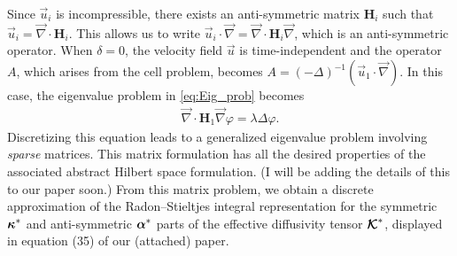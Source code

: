 \documentclass[11pt]{amsart}
\newcommand{\Hb}{\mathbf{H}}
\newcommand\Kbc{\mbox{\boldmath${\mathcal{K}}$}}
\newcommand\balpha{\mbox{\boldmath${\alpha}$}}
\newcommand\bkappa{\mbox{\boldmath${\kappa}$}}
\begin{document}
Since $\vec{u}_i$ is incompressible, there exists
an anti-symmetric matrix $\Hb_i$ such that
$\vec{u}_i=\vec{\nabla}\cdot\Hb_i$. This allows us to write
$\vec{u}_i\cdot\vec{\nabla}=\vec{\nabla}\cdot\Hb_i\vec{\nabla}$, which is an anti-symmetric
operator. When $\delta=0$, the velocity field $\vec{u}$ is time-independent
and the operator $A$, which arises from the cell problem, becomes
$A=(-\Delta)^{-1}(\vec{u}_1\cdot\vec{\nabla})$. In this case, the eigenvalue problem in
\eqref{eq:Eig_prob} becomes 
%
\begin{align}\label{eq:Eig_prob_steady}
  \vec{\nabla}\cdot\Hb_1\vec{\nabla}\varphi=\lambda\Delta\varphi.
\end{align}
%
Discretizing this equation leads to a generalized eigenvalue
problem involving \emph{sparse} matrices. This matrix formulation has
all the desired properties of the associated abstract Hilbert space
formulation. (I will be adding the details of this to our paper soon.)
From this matrix problem, we obtain a discrete approximation of the
Radon--Stieltjes integral representation for the symmetric $\bkappa^*$
and anti-symmetric $\balpha^*$ parts of the effective diffusivity
tensor $\Kbc^*$, displayed in equation (35) of our (attached) paper.  
\end{document}
